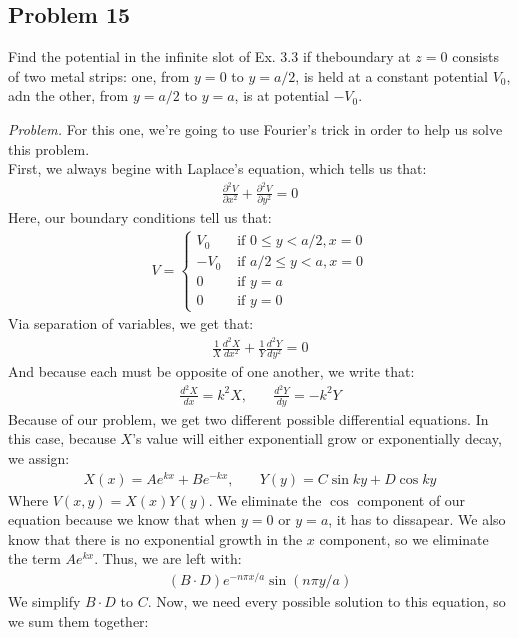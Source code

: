 \documentclass[10pt,oneside]{book}
\newcommand{\gspc}{\vspace{0.13cm}} %
\newcommand{\gline}[0]{\gspc\\} %
\newcommand{\prt}[2]{\frac{\partial#1}{\partial#2}}
\newenvironment{problem}[1]
  {\vspace{-0.1cm}\begin{tcolorbox}[problembox]
   \textit{Problem. }#1}
  {\end{tcolorbox}\gspc}
\begin{document}
\subsection*{Problem 15}
Find the potential in the infinite slot of Ex. 3.3 if theboundary at $z = 0$ consists of two metal strips: one, from $y=0$ to $y = a/2$, is held at a constant potential $V_0$, adn the other, from $y = a/2$ to $y = a$, is at potential $-V_0$.
\begin{problem}
  For this one, we're going to use Fourier's trick in order to help us solve this problem. \gline{}
  First, we always begine with Laplace's equation, which tells us that:
  \begin{align*}
    \prt{^2V}{x^2}+\prt{^2V}{y^2} = 0
  \end{align*}
  Here, our boundary conditions tell us that:
  \begin{align*}
    V = \begin{cases}
      V_0 &\text{ if }0\le y < a/2, x = 0\\
      -V_0 &\text{ if }a/2 \le y < a, x = 0\\
      0 &\text{ if }y = a\\
      0 &\text{ if }y = 0
    \end{cases}
  \end{align*}
  Via separation of variables, we get that:
  \begin{align}
    \frac{1}X\frac{d^2X}{dx^2}+\frac{1}Y\frac{d^2Y}{dy^2} = 0
  \end{align}
  And because each must be opposite of one another, we write that:
  \begin{align*}
    \frac{d^2X}{dx} = k^2X, &\quad\frac{d^2Y}{dy} = -k^2Y
  \end{align*}
  Because of our problem, we get two different possible differential equations. In this case, because $X$'s value will either exponentiall grow or exponentially decay, we assign:
  \begin{align}
    X(x) = Ae^{kx}+Be^{-kx},&\quad Y(y) = C\sin ky + D \cos ky
  \end{align}
  Where $V(x,y) = X(x)Y(y)$. We eliminate the $\cos$ component of our equation because we know that when $y = 0$ or $y = a$, it has to dissapear. We also know that there is no exponential growth in the $x$ component, so we eliminate the term $Ae^{kx}$. Thus, we are left with:
  \begin{align}
    (B\cdot D)e^{-n\pi x /a}\sin(n\pi y/a)
  \end{align}
  We simplify $B\cdot D$ to $C$. Now, we need every possible solution to this equation, so we sum them together:

\end{problem}
\end{document}
